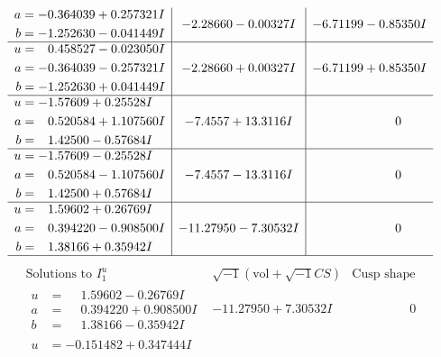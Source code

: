 \documentclass[1p]{elsarticle_modified}
\theoremstyle{definition}
\newcommand{\I}{\sqrt{-1}}
\begin{document}
$$\begin{array}{c|c|c}
\begin{aligned}
a &= -0.364039 + 0.257321 I \\
b &= -1.252630 - 0.041449 I\end{aligned}
 & -2.28660 - 0.00327 I & -6.71199 - 0.85350 I \\ \hline\begin{aligned}
u &= \phantom{-}0.458527 - 0.023050 I \\
a &= -0.364039 - 0.257321 I \\
b &= -1.252630 + 0.041449 I\end{aligned}
 & -2.28660 + 0.00327 I & -6.71199 + 0.85350 I \\ \hline\begin{aligned}
u &= -1.57609 + 0.25528 I \\
a &= \phantom{-}0.520584 + 1.107560 I \\
b &= \phantom{-}1.42500 - 0.57684 I\end{aligned}
 & -7.4557 + 13.3116 I & \phantom{-0.000000 } 0 \\ \hline\begin{aligned}
u &= -1.57609 - 0.25528 I \\
a &= \phantom{-}0.520584 - 1.107560 I \\
b &= \phantom{-}1.42500 + 0.57684 I\end{aligned}
 & -7.4557 - 13.3116 I & \phantom{-0.000000 } 0 \\ \hline\begin{aligned}
u &= \phantom{-}1.59602 + 0.26769 I \\
a &= \phantom{-}0.394220 - 0.908500 I \\
b &= \phantom{-}1.38166 + 0.35942 I\end{aligned}
 & -11.27950 - 7.30532 I & \phantom{-0.000000 } 0\\
 \hline 
 \end{array}$$\newpage$$\begin{array}{c|c|c}  
\text{Solutions to }I^u_{1}& \I (\text{vol} + \sqrt{-1}CS) & \text{Cusp shape}\\
 \hline 
\begin{aligned}
u &= \phantom{-}1.59602 - 0.26769 I \\
a &= \phantom{-}0.394220 + 0.908500 I \\
b &= \phantom{-}1.38166 - 0.35942 I\end{aligned}
 & -11.27950 + 7.30532 I & \phantom{-0.000000 } 0 \\ \hline\begin{aligned}
u &= -0.151482 + 0.347444 I \\

\end{aligned}
\end{array}$$
\end{document}
